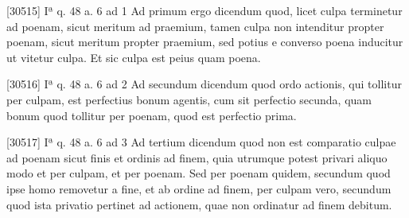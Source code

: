 \documentclass[10pt]{jsarticle} %
\begin{document}
[30515] Iª q. 48 a. 6 ad 1 Ad primum ergo dicendum quod, licet culpa terminetur ad poenam, sicut meritum ad praemium, tamen culpa non intenditur propter poenam, sicut meritum propter praemium, sed potius e converso poena inducitur ut vitetur culpa. Et sic culpa est peius quam poena.

[30516] Iª q. 48 a. 6 ad 2 Ad secundum dicendum quod ordo actionis, qui tollitur per culpam, est perfectius bonum agentis, cum sit perfectio secunda, quam bonum quod tollitur per poenam, quod est perfectio prima.

[30517] Iª q. 48 a. 6 ad 3 Ad tertium dicendum quod non est comparatio culpae ad poenam sicut finis et ordinis ad finem, quia utrumque potest privari aliquo modo et per culpam, et per poenam. Sed per poenam quidem, secundum quod ipse homo removetur a fine, et ab ordine ad finem, per culpam vero, secundum quod ista privatio pertinet ad actionem, quae non ordinatur ad finem debitum.
\end{document}

